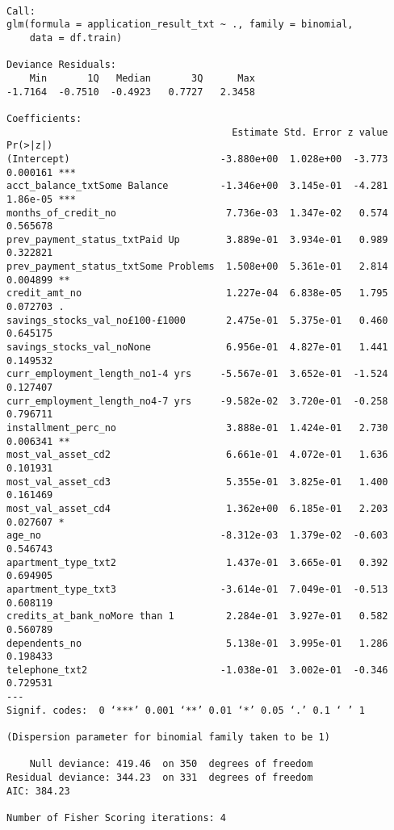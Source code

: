 \documentclass[11pt]{article}
\begin{document}
    
    \begin{verbatim}

Call:
glm(formula = application_result_txt ~ ., family = binomial, 
    data = df.train)

Deviance Residuals: 
    Min       1Q   Median       3Q      Max  
-1.7164  -0.7510  -0.4923   0.7727   2.3458  

Coefficients:
                                       Estimate Std. Error z value Pr(>|z|)    
(Intercept)                          -3.880e+00  1.028e+00  -3.773 0.000161 ***
acct_balance_txtSome Balance         -1.346e+00  3.145e-01  -4.281 1.86e-05 ***
months_of_credit_no                   7.736e-03  1.347e-02   0.574 0.565678    
prev_payment_status_txtPaid Up        3.889e-01  3.934e-01   0.989 0.322821    
prev_payment_status_txtSome Problems  1.508e+00  5.361e-01   2.814 0.004899 ** 
credit_amt_no                         1.227e-04  6.838e-05   1.795 0.072703 .  
savings_stocks_val_no£100-£1000       2.475e-01  5.375e-01   0.460 0.645175    
savings_stocks_val_noNone             6.956e-01  4.827e-01   1.441 0.149532    
curr_employment_length_no1-4 yrs     -5.567e-01  3.652e-01  -1.524 0.127407    
curr_employment_length_no4-7 yrs     -9.582e-02  3.720e-01  -0.258 0.796711    
installment_perc_no                   3.888e-01  1.424e-01   2.730 0.006341 ** 
most_val_asset_cd2                    6.661e-01  4.072e-01   1.636 0.101931    
most_val_asset_cd3                    5.355e-01  3.825e-01   1.400 0.161469    
most_val_asset_cd4                    1.362e+00  6.185e-01   2.203 0.027607 *  
age_no                               -8.312e-03  1.379e-02  -0.603 0.546743    
apartment_type_txt2                   1.437e-01  3.665e-01   0.392 0.694905    
apartment_type_txt3                  -3.614e-01  7.049e-01  -0.513 0.608119    
credits_at_bank_noMore than 1         2.284e-01  3.927e-01   0.582 0.560789    
dependents_no                         5.138e-01  3.995e-01   1.286 0.198433    
telephone_txt2                       -1.038e-01  3.002e-01  -0.346 0.729531    
---
Signif. codes:  0 ‘***’ 0.001 ‘**’ 0.01 ‘*’ 0.05 ‘.’ 0.1 ‘ ’ 1

(Dispersion parameter for binomial family taken to be 1)

    Null deviance: 419.46  on 350  degrees of freedom
Residual deviance: 344.23  on 331  degrees of freedom
AIC: 384.23

Number of Fisher Scoring iterations: 4

    \end{verbatim}
\end{document}
